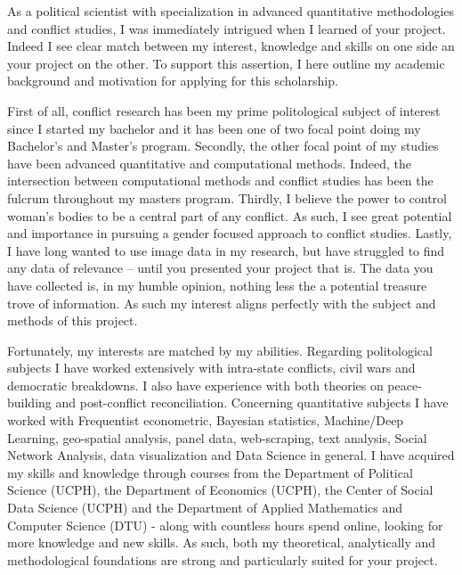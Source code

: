 \documentclass[a4paper]{article}
\begin{document}

As a political scientist with specialization in advanced quantitative methodologies and conflict studies, I was immediately intrigued when I learned of your project. Indeed I see clear match between my interest, knowledge and skills on one side an your project on the other. To support this assertion, I here outline my academic background and motivation for applying for this scholarship.\par

First of all, conflict research has been my prime politological subject of interest since I started my bachelor and it has been one of two focal point doing my Bachelor's and Master's program. Secondly, the other focal point of my studies have been advanced quantitative and computational methods. Indeed, the intersection between computational methods and conflict studies has been the fulcrum throughout my masters program. Thirdly, I believe the power to control woman's bodies to be a central part of any conflict. As such, I see great potential and importance in pursuing a gender focused approach to conflict studies. Lastly, I have long wanted to use image data in my research, but have struggled to find any data of relevance -- until you presented your project that is. The data you have collected is, in my humble opinion, nothing less the a potential treasure trove of information. As such my interest aligns perfectly with the subject and methods of this project.\par

Fortunately, my interests are matched by my abilities. Regarding politological subjects I have worked extensively with intra-state conflicts, civil wars and democratic breakdowns. I also have experience with both theories on peace-building and post-conflict reconciliation. Concerning quantitative subjects I have worked with Frequentist econometric, Bayesian statistics, Machine/Deep Learning, geo-spatial analysis, panel data, web-scraping, text analysis, Social Network Analysis, data visualization and Data Science in general. I have acquired my skills and knowledge through courses from the Department of Political Science (UCPH), the Department of Economics (UCPH), the Center of Social Data Science (UCPH) and the Department of Applied Mathematics and Computer Science (DTU) - along with countless hours spend online, looking for more knowledge and new skills. As such, both my theoretical, analytically and methodological foundations are strong and particularly suited for your project.\par %
\end{document}
